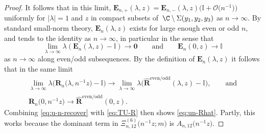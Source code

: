 \begin{proof}
It follows that in this limit, $\mathbf{E}_{n,+}(\lambda,z)=\mathbf{E}_{n,-}(\lambda,z)\big(\mathbb{I}+\mathcal{O}\big(n^{-1}\big)\big)$ uniformly for $|\lambda|=1$ and $z$ in compact subsets of~$\C\setminus \Sigma(y_1, y_2, y_3)$ as $n\to\infty$. By standard small-norm theory, $\mathbf{E}_n(\lambda,z)$ exists for large enough even or odd $n$, and tends to the identity as $n\to\infty$, in particular in the sense that
\begin{equation*}
 \lim_{\lambda\to\infty}\lambda(\mathbf{E}_n(\lambda,z)-\mathbb{I})\to\mathbf{0}\qquad\text{and}\qquad\mathbf{E}_n(0,z)\to\mathbb{I}
\end{equation*}
as $n\to\infty$ along even/odd subsequences. By the definition of $\mathbf{E}_n(\lambda,z)$ it follows that in the same limit
\begin{gather*}
 \lim_{\lambda\to\infty}\lambda\big(\mathbf{R}_n\big(\lambda,n^{-1}z\big)-\mathbb{I}\big)\to\lim_{\lambda\to\infty}\lambda\big(\hat{\mathbf{R}}^\mathrm{even/odd}(\lambda,z)-\mathbb{I}\big), \qquad \text{and}\\
 \mathbf{R}_n\big(0,n^{-1}z\big)\to\hat{\mathbf{R}}^\mathrm{even/odd}(0,z).
\end{gather*}
Combining \eqref{eq:u-n-recover} with \eqref{eq:TU-R} then shows \eqref{eq:un-Rhat}.
Partly, this works because the dominant term in $\Xi_{n,12}^{(6)}\big(n^{-1}z;m\big)$ is $A_{n,12}\big(n^{-1}z\big)$.
\end{proof}

